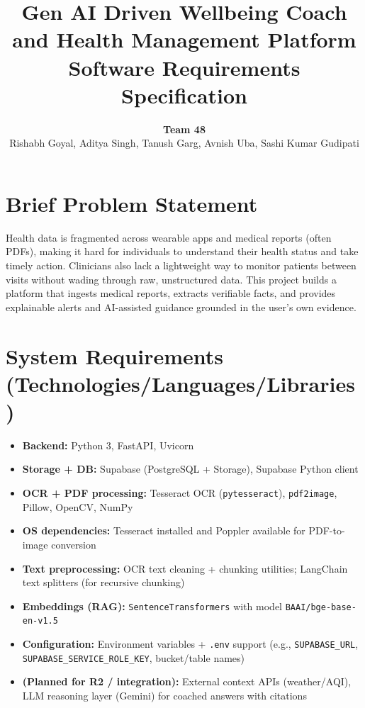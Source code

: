 \documentclass[12pt, a4paper]{article}
\title{\textbf{Gen AI Driven Wellbeing Coach and Health Management Platform} \\ \large Software Requirements Specification}
\author{\textbf{Team 48} \\ Rishabh Goyal, Aditya Singh, Tanush Garg, Avnish Uba, Sashi Kumar Gudipati}
\date{}
\begin{document}
\raggedbottom

\maketitle

\section{Brief Problem Statement}
Health data is fragmented across wearable apps and medical reports (often PDFs), making it hard for individuals to understand their health status and take timely action. Clinicians also lack a lightweight way to monitor patients between visits without wading through raw, unstructured data. This project builds a platform that ingests medical reports, extracts verifiable facts, and provides explainable alerts and AI-assisted guidance grounded in the user’s own evidence.

\section{System Requirements (Technologies/Languages/Libraries)}
\begin{itemize}[leftmargin=*]
    \item \textbf{Backend:} Python 3, FastAPI, Uvicorn
    \item \textbf{Storage + DB:} Supabase (PostgreSQL + Storage), Supabase Python client
    \item \textbf{OCR + PDF processing:} Tesseract OCR (\texttt{pytesseract}), \texttt{pdf2image}, Pillow, OpenCV, NumPy
    \item \textbf{OS dependencies:} Tesseract installed and Poppler available for PDF-to-image conversion
    \item \textbf{Text preprocessing:} OCR text cleaning + chunking utilities; LangChain text splitters (for recursive chunking)
    \item \textbf{Embeddings (RAG):} \texttt{SentenceTransformers} with model \texttt{BAAI/bge-base-en-v1.5}
    \item \textbf{Configuration:} Environment variables + \texttt{.env} support (e.g., \texttt{SUPABASE\_URL}, \texttt{SUPABASE\_SERVICE\_ROLE\_KEY}, bucket/table names)
    \item \textbf{(Planned for R2 / integration):} External context APIs (weather/AQI), LLM reasoning layer (Gemini) for coached answers with citations
\end{itemize}
\end{document}
